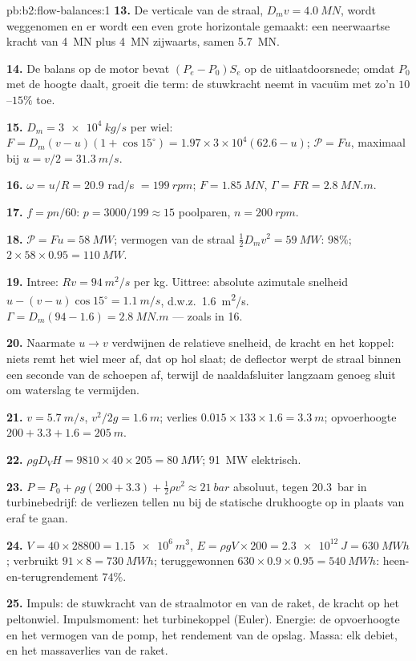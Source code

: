 \begin{solution}{pb:b2:flow-balances:1}
\textbf{13.} De verticale  van de straal, $D_mv = \qty{4.0}{MN}$,
wordt weggenomen en er wordt een even grote horizontale gemaakt: een
neerwaartse kracht van \qty{4}{MN} plus \qty{4}{MN} zijwaarts, samen
\qty{5.7}{MN}.

\textbf{14.} De balans op de motor bevat $(P_e - P_0)S_e$ op de
uitlaatdoorsnede; omdat $P_0$ met de hoogte daalt, groeit die term: de
stuwkracht neemt in vacuüm met zo'n $10$--$15\%$ toe.

\textbf{15.} $D_m = \qty{3e4}{kg/s}$ per wiel:
$F = D_m(v - u)(1 + \cos15^\circ) =
1.97 \times 3 \times 10^4(62.6 - u)$;
$\mathcal P = Fu$, maximaal bij $u = v/2 = \qty{31.3}{m/s}$.

\textbf{16.} $\omega = u/R = 20.9$ rad/s $= \qty{199}{rpm}$;
$F = \qty{1.85}{MN}$, $\Gamma = FR
= \qty{2.8}{MN.m}$.

\textbf{17.} $f = pn/60$: $p = 3000/199 \approx 15$ poolparen, $n = \qty{200}{rpm}$.

\textbf{18.} $\mathcal P = Fu = \qty{58}{MW}$; vermogen van de straal
$\tfrac12D_mv^2 = \qty{59}{MW}$: $98\%$;
$2 \times 58 \times 0.95 = \qty{110}{MW}$.

\textbf{19.} Intree: $Rv = \qty{94}{m^2/s}$ per kg. Uittree: absolute
azimutale snelheid $u - (v - u)\cos15^\circ = \qty{1.1}{m/s}$, d.w.z.\
\qty{1.6}{m^2/s}. $\Gamma = D_m(94 -
1.6) = \qty{2.8}{MN.m}$ --- zoals in
16.

\textbf{20.} Naarmate $u \to v$ verdwijnen de relatieve snelheid, de kracht
en het koppel: niets remt het wiel meer af, dat op hol slaat; de deflector
werpt de straal binnen een seconde van de schoepen af, terwijl de
naaldafsluiter langzaam genoeg sluit om waterslag te vermijden.

\textbf{21.} $v = \qty{5.7}{m/s}$, $v^2/2g = \qty{1.6}{m}$; verlies
$0.015 \times 133 \times 1.6 =
\qty{3.3}{m}$; opvoerhoogte
$200 + 3.3 + 1.6 = \qty{205}{m}$.

\textbf{22.} $\rho gD_VH = 9810 \times 40 \times 205 = \qty{80}{MW}$;
\qty{91}{MW} elektrisch.

\textbf{23.}
$P = P_0 + \rho g(200 + 3.3) + \tfrac12\rho v^2 \approx \qty{21}{bar}$
absoluut, tegen \qty{20.3}{bar} in turbinebedrijf: de verliezen tellen nu
bij de statische drukhoogte op in plaats van eraf te gaan.

\textbf{24.} $V = 40 \times 28800 = \qty{1.15e6}{m^3}$,
$E = \rho gV \times 200 = \qty{2.3e12}{J}
= \qty{630}{MWh}$; verbruikt
$91 \times 8 = \qty{730}{MWh}$; teruggewonnen
$630 \times 0.9 \times
0.95 = \qty{540}{MWh}$: heen-en-terugrendement
$74\%$.

\textbf{25.} Impuls: de stuwkracht van de straalmotor en van de raket, de
kracht op het peltonwiel. Impulsmoment: het turbinekoppel (Euler). Energie:
de opvoerhoogte en het vermogen van de pomp, het rendement van de opslag.
Massa: elk debiet, en het massaverlies van de raket.
\end{solution}
